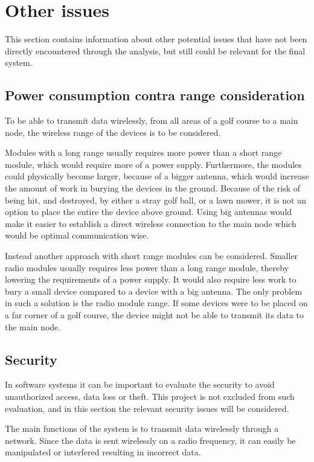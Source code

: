 \section{Other issues}
This section contains information about other potential issues that have not been directly encountered through the analysis, but still could be relevant for the final system.

\subsection{Power consumption contra range consideration} \label{cha:batcons}
To be able to transmit data wirelessly, from all areas of a golf course to a main node, the wireless range of the devices is to be considered.

Modules with a long range usually requires more power than a short range module, which would require more of a power supply. Furthermore, the modules could physically become larger, because of a bigger antenna, which would increase the amount of work in burying the devices in the ground. Because of the risk of being hit, and destroyed, by either a stray golf ball, or a lawn mower, it is not an option to place the entire the device above ground. Using big antennas would make it easier to establish a direct wireless connection to the main node which would be optimal communication wise.

Instead another approach with short range modules can be considered. Smaller radio modules usually requires less power than a long range module, thereby lowering the requirements of a power supply. It would also require less work to bury a small device compared to a device with a big antenna. The only problem in such a solution is the radio module range. If some devices were to be placed on a far corner of a golf course, the device might not be able to transmit its data to the main node. 

\subsection{Security}
In software systems it can be important to evaluate the security to avoid unauthorized access, data loss or theft. This project is not excluded from such evaluation, and in this section the relevant security issues will be considered.

The main functions of the system is to transmit data wirelessly through a network. Since the data is sent wirelessly on a radio frequency, it can easily be manipulated or interfered resulting in incorrect data.

